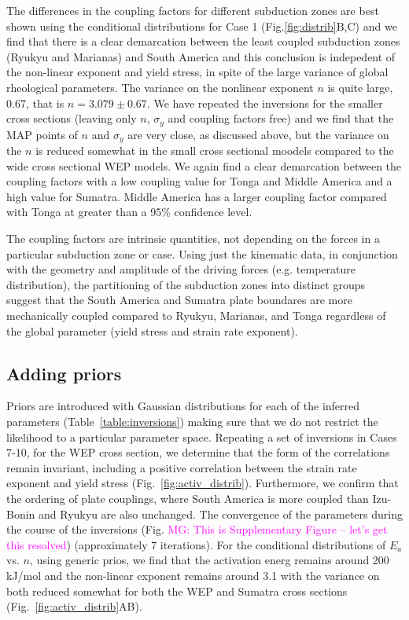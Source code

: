 \documentclass[12pt]{article}
\newcommand{\mgnote}[1]{\textcolor{magenta}{MG: #1}}
\begin{document}
{The differences in the coupling factors for different subduction zones are
best shown using the conditional distributions for Case 1  (Fig.\ref{fig:distrib}B,C) and we find that there is a clear demarcation between the least coupled subduction zones (Ryukyu and Marianas) and South America 
and this conclusion is indepedent of the non-linear exponent and yield stress, in spite of the large variance of global rheological parameters.
The variance on the nonlinear exponent $n$ is quite large, 0.67, that is $n=3.079 \pm 0.67$.
We have repeated the inversions for the smaller cross sections (leaving only $n$, $\sigma_y$ and coupling factors free) and we find that
the MAP points of $n$ and $\sigma_y$ are very close, as discussed above, but the variance on the $n$ is reduced somewhat in the small cross sectional moodels compared to the wide cross sectional WEP models.
We again find a clear demarcation between the coupling factors with a low coupling value for Tonga and Middle America and a high value for Sumatra.
Middle America has a larger coupling factor compared with Tonga at greater than a 95\% confidence level.

The coupling factors are intrinsic quantities, not depending on the forces in a particular subduction zone or case.
Using just the kinematic data, in conjunction with the geometry and amplitude of the driving forces (e.g. temperature distribution),
the partitioning of the subduction zones into distinct groups  suggest that the South America and Sumatra plate boundares are more mechanically coupled compared to Ryukyu, Marianas, and Tonga regardless of the global parameter (yield stress and strain rate exponent).


\subsection{Adding priors}

Priors are introduced with Gaussian distributions for each of the inferred parameters (Table~\ref{table:inversions}) making sure that we do not restrict the likelihood to a particular parameter space.  Repeating a set of inversions in Cases 7-10, for the WEP cross section, we determine that the form of the correlations remain invariant, including a positive correlation between the strain rate exponent and yield stress
(Fig.~\ref{fig:activ_distrib}). Furthermore, we confirm that the ordering of plate couplings, where South America is more coupled than Izu-Bonin and Ryukyu are also unchanged. 
The convergence of the parameters during the course of the inversions
(Fig. \mgnote{This is Supplementary Figure -- let's get this resolved}) 
(approximately 7 iterations).
For the conditional distributions of $E_a$ vs. $n$, using generic prios, we find that the 
activation energ remains around 200 kJ/mol and the non-linear
exponent remains around 3.1 with the variance on both reduced somewhat
for both the WEP and Sumatra cross sections
(Fig.~\ref{fig:activ_distrib}AB).

}
\end{document}
